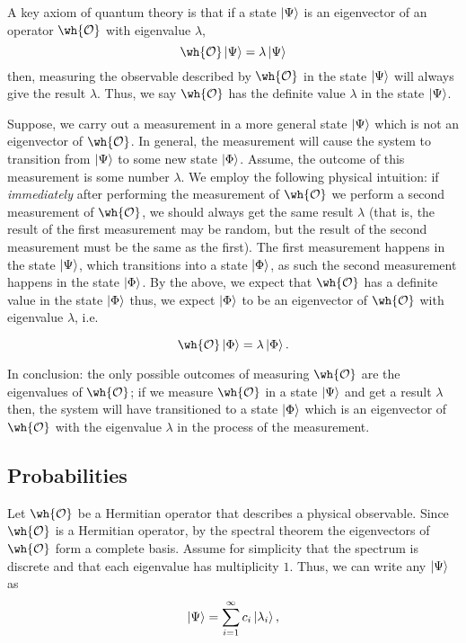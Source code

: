 \documentclass[12pt, a4paper]{article}
\begin{document}
A key axiom of quantum theory is that if a state \(\ket{\Psi}\) is an eigenvector of an operator \(\wh{\mathcal{O}}\) with eigenvalue \(\lambda\), 
\[\wh{\mathcal{O}} \ket{\Psi} = \lambda \ket{\Psi}\]
then, measuring the observable described by \(\wh{\mathcal{O}}\) in the state \(\ket{\Psi}\) will always give the result \(\lambda\). Thus, we say \(\wh{\mathcal{O}}\) has the definite value \(\lambda\) in the state \(\ket{\Psi}\).

Suppose, we carry out a measurement in a more general state \(\ket{\Psi}\) which is not an eigenvector of \(\wh{\mathcal{O}}\). In general, the measurement will cause the system to transition from \(\ket{\Psi}\) to some new state \(\ket{\Phi}\). Assume, the outcome of this measurement is some number \(\lambda\). We employ the following physical intuition: if \textit{immediately} after performing the measurement of \(\wh{\mathcal{O}}\) we perform a second measurement of \(\wh{\mathcal{O}}\), we should always get the same result \(\lambda\) (that is, the result of the first measurement may be random, but the result of the second measurement must be the same as the first). The first measurement happens in the state \(\ket{\Psi}\), which transitions into a state \(\ket{\Phi}\), as such the second measurement happens in the state \(\ket{\Phi}\). By the above, we expect that \(\wh{\mathcal{O}}\) has a definite value in the state \(\ket{\Phi}\) thus, we expect \(\ket{\Phi}\) to be an eigenvector of \(\wh{\mathcal{O}}\) with eigenvalue \(\lambda\), i.e. 

\[\wh{\mathcal{O}} \ket{\Phi} = \lambda \ket{\Phi}.\]

In conclusion: the only possible outcomes of measuring \(\wh{\mathcal{O}}\) are the eigenvalues of \(\wh{\mathcal{O}}\); if we measure \(\wh{\mathcal{O}}\) in a state \(\ket{\Psi}\) and get a result \(\lambda\) then, the system will have transitioned to a state \(\ket{\Phi}\) which is an eigenvector of \(\wh{\mathcal{O}} \) with the eigenvalue \(\lambda\) in the process of the measurement.

\subsection{Probabilities}

Let \(\wh{\mathcal{O}}\) be a Hermitian operator that describes a physical observable. Since \(\wh{\mathcal{O}}\) is a Hermitian operator, by the spectral theorem the eigenvectors of \(\wh{\mathcal{O}}\) form a complete basis. Assume for simplicity that the spectrum is discrete and that each eigenvalue has multiplicity \(1\). Thus, we can write any \(\ket{\Psi}\) as 
\[\ket{\Psi} = \sum_{i=1}^{\infty} c_i \ket{\lambda_i},\]
\end{document}
